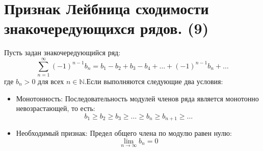 \documentclass[14pt]{extreport}
\begin{document}
    \chapter{Признак Лейбница сходимости знакочередующихся рядов. (9)}
    \begin{theorem}
        Пусть задан знакочередующийся ряд:$$\sum_{n=1}^{\infty} (-1)^{n-1} b_n = b_1 - b_2 + b_3 - b_4 + \dots + (-1)^{n-1} b_n + \dots$$где $b_n > 0$ для всех $n \in \mathbb{N}$.Если выполняются следующие два условия:
        \begin{itemize}
            \item Монотонность: Последовательность модулей членов ряда является монотонно невозрастающей, то есть:$$b_1 \ge b_2 \ge b_3 \ge \dots \ge b_n \ge b_{n+1} \ge \dots$$
            \item Необходимый признак: Предел общего члена по модулю равен нулю:$$\lim_{n \to \infty} b_n = 0$$
        \end{itemize}

    \end{theorem}
\end{document}

